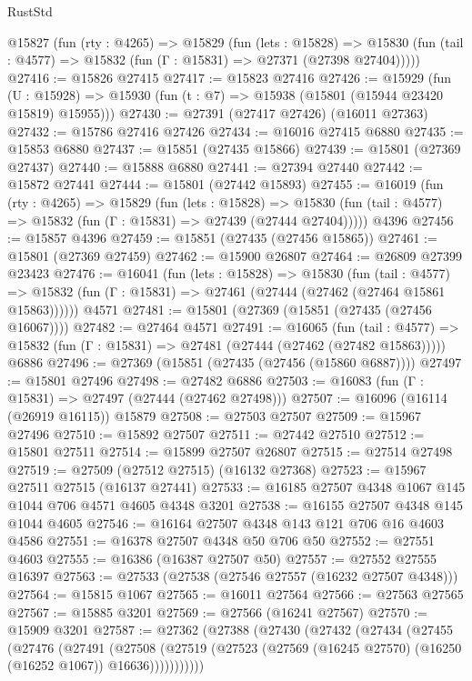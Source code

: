 \begin{lexlean}{RustStd}
\begin{coremodule}
  @15827
    (fun (rty : @4265) =>
    @15829
      (fun (lets : @15828) =>
      @15830 (fun (tail : @4577) => @15832 (fun (Γ : @15831) => @27371 (@27398 @27404)))))
@27416 := @15826 @27415
@27417 := @15823 @27416
@27426 := @15929
    (fun (U : @15928) => @15930 (fun (t : @7) => @15938 (@15801 (@15944 @23420 @15819) @15955)))
@27430 := @27391 (@27417 @27426) (@16011 @27363)
@27432 := @15786 @27416 @27426
@27434 := @16016 @27415 @6880
@27435 := @15853 @6880
@27437 := @15851 (@27435 @15866)
@27439 := @15801 (@27369 @27437)
@27440 := @15888 @6880
@27441 := @27394 @27440
@27442 := @15872 @27441
@27444 := @15801 (@27442 @15893)
@27455 := @16019
    (fun (rty : @4265) =>
    @15829
      (fun (lets : @15828) =>
      @15830 (fun (tail : @4577) => @15832 (fun (Γ : @15831) => @27439 (@27444 @27404)))))
    @4396
@27456 := @15857 @4396
@27459 := @15851 (@27435 (@27456 @15865))
@27461 := @15801 (@27369 @27459)
@27462 := @15900 @26807
@27464 := @26809 @27399 @23423
@27476 := @16041
    (fun (lets : @15828) =>
    @15830
      (fun (tail : @4577) =>
      @15832 (fun (Γ : @15831) => @27461 (@27444 (@27462 (@27464 @15861 @15863))))))
    @4571
@27481 := @15801 (@27369 (@15851 (@27435 (@27456 @16067))))
@27482 := @27464 @4571
@27491 := @16065
    (fun (tail : @4577) => @15832 (fun (Γ : @15831) => @27481 (@27444 (@27462 (@27482 @15863)))))
    @6886
@27496 := @27369 (@15851 (@27435 (@27456 (@15860 @6887))))
@27497 := @15801 @27496
@27498 := @27482 @6886
@27503 := @16083 (fun (Γ : @15831) => @27497 (@27444 (@27462 @27498)))
@27507 := @16096 (@16114 (@26919 @16115)) @15879
@27508 := @27503 @27507
@27509 := @15967 @27496
@27510 := @15892 @27507
@27511 := @27442 @27510
@27512 := @15801 @27511
@27514 := @15899 @27507 @26807
@27515 := @27514 @27498
@27519 := @27509 (@27512 @27515) (@16132 @27368)
@27523 := @15967 @27511 @27515 (@16137 @27441)
@27533 := @16185 @27507 @4348 @1067 @145 @1044 @706 @4571 @4605 @4348 @3201
@27538 := @16155 @27507 @4348 @145 @1044 @4605
@27546 := @16164 @27507 @4348 @143 @121 @706 @16 @4603 @4586
@27551 := @16378 @27507 @4348 @50 @706 @50
@27552 := @27551 @4603
@27555 := @16386 (@16387 @27507 @50)
@27557 := @27552 @27555 @16397
@27563 := @27533 (@27538 (@27546 @27557 (@16232 @27507 @4348)))
@27564 := @15815 @1067
@27565 := @16011 @27564
@27566 := @27563 @27565
@27567 := @15885 @3201
@27569 := @27566 (@16241 @27567)
@27570 := @15909 @3201
@27587 := @27362
    (@27388
      (@27430
        (@27432
          (@27434
            (@27455
              (@27476
                (@27491
                  (@27508
                    (@27519
                      (@27523 (@27569 (@16245 @27570) (@16250 (@16252 @1067)) @16636)))))))))))

\end{coremodule}
\end{lexlean}
